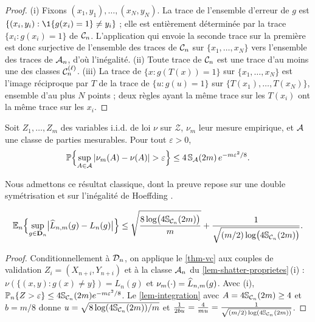 \begin{proof}
(i) Fixons $(x_1,y_1),\dots,(x_N,y_N)$. La trace de l'ensemble d'erreur de $g$ est $\{(x_i,y_i):\1\{g(x_i)=1\}\neq y_i\}$ ; elle est entièrement déterminée par la trace $\{x_i:g(x_i)=1\}$ de $\mathcal{C}_n$. L'application qui envoie la seconde trace sur la première est donc surjective de l'ensemble des traces de $\mathcal{C}_n$ sur $\{x_1,\dots,x_N\}$ vers l'ensemble des traces de $\mathcal{A}_n$, d'où l'inégalité.
(ii) Toute trace de $\mathcal{C}_n$ est une trace d'au moins une des classes $\mathcal{C}_n^{(\ell)}$.
(iii) La trace de $\{x:g(T(x))=1\}$ sur $\{x_1,\dots,x_N\}$ est l'image réciproque par $T$ de la trace de $\{u:g(u)=1\}$ sur $\{T(x_1),\dots,T(x_N)\}$, ensemble d'au plus $N$ points ; deux règles ayant la même trace sur les $T(x_i)$ ont la même trace sur les $x_i$.
\end{proof}

\begin{theoreme}\label{thm-vc}
Soit $Z_1,\dots,Z_m$ des variables i.i.d. de loi $\nu$ sur $\mathcal{Z}$, $\nu_m$ leur mesure empirique, et $\mathcal{A}$ une classe de parties mesurables. Pour tout $\varepsilon>0$,
\[
  \PP\Bigl\{\sup_{A\in\cA}|\nu_m(A)-\nu(A)|>\varepsilon\Bigr\}\le 4\,\Sh_{\cA}(2m)\,e^{-m\varepsilon^2/8}.
\]
\end{theoreme}

Nous admettons ce résultat classique, dont la preuve repose sur une double symétrisation et sur l'inégalité de Hoeffding \citep{vapnik1971uniform,devroye1996probabilistic}.

\begin{proposition}\label{prop-vc}
\[
  \mathbb{E}_n\Bigl\{\sup_{g\in\mathbf{D}_n}\bigl|\widehat{L}_{n,m}(g)-L_n(g)\bigr|\Bigr\}\le\sqrt{\frac{8\log\bigl(4\mathbb{S}_{\mathcal{C}_n}(2m)\bigr)}{m}}+\frac{1}{\sqrt{(m/2)\log\bigl(4\mathbb{S}_{\mathcal{C}_n}(2m)\bigr)}}.
\]
\end{proposition}

\begin{proof}
Conditionnellement à $\mathcal{D}_n$, on applique le \cref{thm-vc} aux couples de validation $Z_i=(X_{n+i},Y_{n+i})$ et à la classe $\mathcal{A}_n$ du \cref{lem-shatter-proprietes}\,(i) : $\nu(\{(x,y):g(x)\neq y\})=L_n(g)$ et $\nu_m(\cdot)=\widehat{L}_{n,m}(g)$. Avec (i), $\mathbb{P}_n\{Z>\varepsilon\}\le4\mathbb{S}_{\mathcal{C}_n}(2m)e^{-m\varepsilon^2/8}$. Le \cref{lem-integration} avec $A=4\mathbb{S}_{\mathcal{C}_n}(2m)\ge4$ et $b=m/8$ donne $u=\sqrt{8\log(4\mathbb{S}_{\mathcal{C}_n}(2m))/m}$ et
$\frac{1}{2bu}=\frac{4}{mu}=\frac{1}{\sqrt{(m/2)\log(4\mathbb{S}_{\mathcal{C}_n}(2m))}}$.
\end{proof}

